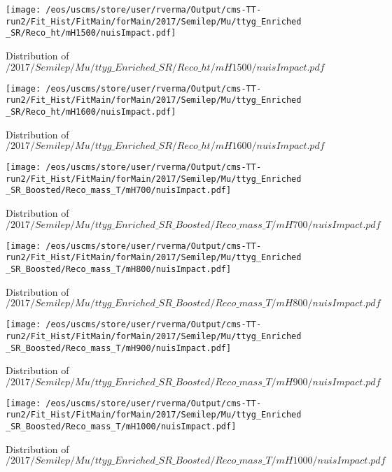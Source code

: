 \begin{figure}
\centering
\texttt{[image: /eos/uscms/store/user/rverma/Output/cms-TT-run2/Fit\_Hist/FitMain/forMain/2017/Semilep/Mu/ttyg\_Enriched\_SR/Reco\_ht/mH1500/nuisImpact.pdf]}
\caption{Distribution of $/2017/Semilep/Mu/ttyg\_Enriched\_SR/Reco\_ht/mH1500/nuisImpact.pdf$}
\end{figure}

\begin{figure}
\centering
\texttt{[image: /eos/uscms/store/user/rverma/Output/cms-TT-run2/Fit\_Hist/FitMain/forMain/2017/Semilep/Mu/ttyg\_Enriched\_SR/Reco\_ht/mH1600/nuisImpact.pdf]}
\caption{Distribution of $/2017/Semilep/Mu/ttyg\_Enriched\_SR/Reco\_ht/mH1600/nuisImpact.pdf$}
\end{figure}

\begin{figure}
\centering
\texttt{[image: /eos/uscms/store/user/rverma/Output/cms-TT-run2/Fit\_Hist/FitMain/forMain/2017/Semilep/Mu/ttyg\_Enriched\_SR\_Boosted/Reco\_mass\_T/mH700/nuisImpact.pdf]}
\caption{Distribution of $/2017/Semilep/Mu/ttyg\_Enriched\_SR\_Boosted/Reco\_mass\_T/mH700/nuisImpact.pdf$}
\end{figure}

\begin{figure}
\centering
\texttt{[image: /eos/uscms/store/user/rverma/Output/cms-TT-run2/Fit\_Hist/FitMain/forMain/2017/Semilep/Mu/ttyg\_Enriched\_SR\_Boosted/Reco\_mass\_T/mH800/nuisImpact.pdf]}
\caption{Distribution of $/2017/Semilep/Mu/ttyg\_Enriched\_SR\_Boosted/Reco\_mass\_T/mH800/nuisImpact.pdf$}
\end{figure}

\begin{figure}
\centering
\texttt{[image: /eos/uscms/store/user/rverma/Output/cms-TT-run2/Fit\_Hist/FitMain/forMain/2017/Semilep/Mu/ttyg\_Enriched\_SR\_Boosted/Reco\_mass\_T/mH900/nuisImpact.pdf]}
\caption{Distribution of $/2017/Semilep/Mu/ttyg\_Enriched\_SR\_Boosted/Reco\_mass\_T/mH900/nuisImpact.pdf$}
\end{figure}

\begin{figure}
\centering
\texttt{[image: /eos/uscms/store/user/rverma/Output/cms-TT-run2/Fit\_Hist/FitMain/forMain/2017/Semilep/Mu/ttyg\_Enriched\_SR\_Boosted/Reco\_mass\_T/mH1000/nuisImpact.pdf]}
\caption{Distribution of $/2017/Semilep/Mu/ttyg\_Enriched\_SR\_Boosted/Reco\_mass\_T/mH1000/nuisImpact.pdf$}
\end{figure}

